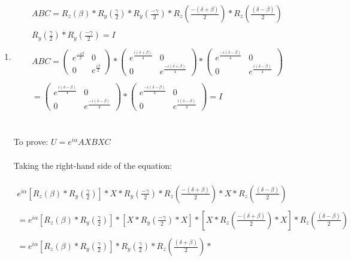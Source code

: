 \documentclass[a4paper,12pt]{article}
\begin{document}
\begin{enumerate}[label=(\alph*)]
\item \begin{gather*}
    ABC= R_z(\beta)*R_y(\frac{\gamma}{2})*R_y(\frac{-\gamma}{2})*R_z(\frac{-(\delta + \beta)}{2})*R_z(\frac{(\delta - \beta)}{2})
    \\~\\
    R_y(\frac{\gamma}{2})*R_y(\frac{-\gamma}{2}) = I
    \\~\\
    ABC= \begin{pmatrix}
e^\frac{-i\beta}{2} & 0 \\
0 & e^\frac{i\beta}{2} 
\end{pmatrix} * \begin{pmatrix}
e^\frac{i(\delta + \beta)}{4} & 0 \\
0 & e^\frac{-i(\delta + \beta)}{4} 
\end{pmatrix}* \begin{pmatrix}
e^\frac{-i(\delta - \beta)}{4} & 0 \\
0 & e^\frac{i(\delta - \beta)}{4} 
\end{pmatrix}\\~\\
= \begin{pmatrix}
e^\frac{i(\delta - \beta)}{4} & 0 \\
0 & e^\frac{-i(\delta - \beta)}{4} 
\end{pmatrix}* \begin{pmatrix}
e^\frac{-i(\delta - \beta)}{4} & 0 \\
0 & e^\frac{i(\delta - \beta)}{4} 
\end{pmatrix} = I
\end{gather*}\\~\\
To prove: $U=e^{i\alpha}AXBXC$\\~\\
Taking the right-hand side of the equation:\\~\\
\begin{gather*}
    e^{i\alpha}[R_z(\beta)*R_y(\frac{\gamma}{2})]* X * R_y(\frac{-\gamma}{2})*R_z(\frac{-(\delta + \beta)}{2}) * X * R_z(\frac{(\delta - \beta)}{2})\\ ~\\
    = e^{i\alpha}[R_z(\beta)*R_y(\frac{\gamma}{2})]* [X * R_y(\frac{-\gamma}{2})* X] * [ X * R_z(\frac{-(\delta + \beta)}{2}) * X] * R_z(\frac{(\delta - \beta)}{2})\\~\\
    = e^{i\alpha}[R_z(\beta)*R_y(\frac{\gamma}{2})] * R_y(\frac{\gamma}{2}) * R_z(\frac{(\delta + \beta)}{2}) *

\end{gather*}
\end{enumerate}
\end{document}
